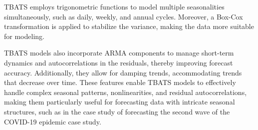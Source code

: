\documentclass[conference]{IEEEtran}
\begin{document}
TBATS employs trigonometric functions to model multiple seasonalities simultaneously, such as daily, weekly, and annual cycles. Moreover, a Box-Cox transformation is applied to stabilize the variance, making the data more suitable for modeling.

TBATS models also incorporate ARMA components to manage short-term dynamics and autocorrelations in the residuals, thereby improving forecast accuracy. Additionally, they allow for damping trends, accommodating trends that decrease over time. These features enable TBATS models to effectively handle complex seasonal patterns, nonlinearities, and residual autocorrelations, making them particularly useful for forecasting data with intricate seasonal structures, such as in the case study of forecasting the second wave of the COVID-19 epidemic case study.\cite{b14}
\end{document}
